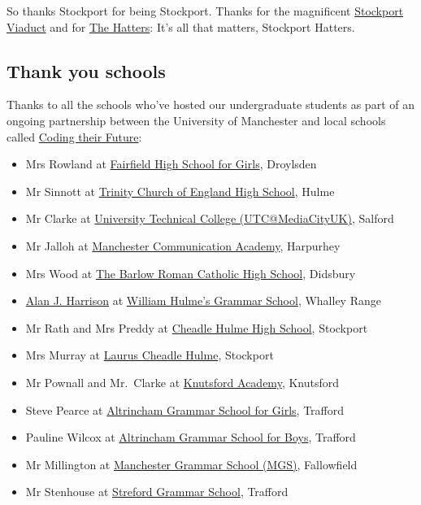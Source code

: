 \documentclass[
]{book}
\providecommand{\tightlist}{%
  \setlength{\itemsep}{0pt}\setlength{\parskip}{0pt}}
\begin{document}
So thanks Stockport for being Stockport. Thanks for the magnificent \href{https://en.wikipedia.org/wiki/Stockport_Viaduct}{Stockport Viaduct} and for \href{https://en.wikipedia.org/wiki/Stockport_County_F.C.}{The Hatters}: It's all that matters, Stockport Hatters. 🙏

\hypertarget{schools}{%
\subsection{Thank you schools}\label{schools}}

Thanks to all the schools who've hosted our undergraduate students as part of an ongoing partnership between the University of Manchester and local schools called \href{https://personalpages.manchester.ac.uk/staff/duncan.hull/coding-their-future.html}{Coding their Future}:

\begin{itemize}
\tightlist
\item
  Mrs Rowland at \href{https://en.wikipedia.org/wiki/Fairfield_High_School_for_Girls}{Fairfield High School for Girls}, Droylsden
\item
  Mr Sinnott at \href{https://en.wikipedia.org/wiki/Trinity_Church_of_England_High_School}{Trinity Church of England High School}, Hulme
\item
  Mr Clarke at \href{https://en.wikipedia.org/wiki/Aldridge_UTC@MediaCityUK}{University Technical College (UTC@MediaCityUK)}, Salford
\item
  Mr Jalloh at \href{https://en.wikipedia.org/wiki/Manchester_Communication_Academy}{Manchester Communication Academy}, Harpurhey
\item
  Mrs Wood at \href{https://en.wikipedia.org/wiki/The_Barlow_Roman_Catholic_High_School}{The Barlow Roman Catholic High School}, Didsbury
\item
  \href{https://www.amazon.co.uk/Alan-J-Harrison/e/B09GTC2DR6/}{Alan J. Harrison} at \href{https://en.wikipedia.org/wiki/William_Hulme\%27s_Grammar_School}{William Hulme's Grammar School}, Whalley Range
\item
  Mr Rath and Mrs Preddy at \href{https://en.wikipedia.org/wiki/Cheadle_Hulme_High_School}{Cheadle Hulme High School}, Stockport
\item
  Mrs Murray at \href{https://www.lauruscheadlehulme.org.uk/}{Laurus Cheadle Hulme}, Stockport
\item
  Mr Pownall and Mr.~Clarke at \href{https://en.wikipedia.org/wiki/Knutsford_Academy}{Knutsford Academy}, Knutsford
\item
  Steve Pearce at \href{https://en.wikipedia.org/wiki/Altrincham_Grammar_School_for_Girls}{Altrincham Grammar School for Girls}, Trafford
\item
  Pauline Wilcox at \href{https://en.wikipedia.org/wiki/Altrincham_Grammar_School_for_Boys}{Altrincham Grammar School for Boys}, Trafford
\item
  Mr Millington at \href{https://en.wikipedia.org/wiki/Manchester_Grammar_School}{Manchester Grammar School (MGS)}, Fallowfield
\item
  Mr Stenhouse at \href{https://en.wikipedia.org/wiki/Stretford_Grammar_School}{Streford Grammar School}, Trafford
\end{itemize}
\end{document}
